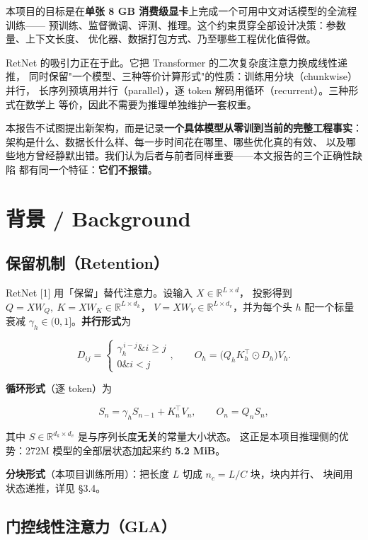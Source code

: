 \documentclass[11pt,openany]{ctexart}
\begin{document}
本项目的目标是在\textbf{单张 8 GB 消费级显卡}上完成一个可用中文对话模型的全流程训练—— 预训练、监督微调、评测、推理。这个约束贯穿全部设计决策：参数量、上下文长度、 优化器、数据打包方式、乃至哪些工程优化值得做。

RetNet 的吸引力正在于此。它把 Transformer 的二次复杂度注意力换成线性递推， 同时保留"一个模型、三种等价计算形式"的性质：训练用分块（chunkwise）并行， 长序列预填用并行（parallel），逐 token 解码用循环（recurrent）。三种形式在数学上 等价，因此不需要为推理单独维护一套权重。

本报告不试图提出新架构，而是记录\textbf{一个具体模型从零训到当前的完整工程事实}： 架构是什么、数据长什么样、每一步时间花在哪里、哪些优化真的有效、 以及哪些地方曾经静默出错。我们认为后者与前者同样重要——本文报告的三个正确性缺陷 都有同一个特征：\textbf{它们不报错}。

\section{背景 / Background}

\subsection{保留机制（Retention）}

RetNet [1] 用「保留」替代注意力。设输入 $X \in \mathbb{R}^{L \times d}$， 投影得到 $Q = XW_Q,\ K = XW_K \in \mathbb{R}^{L \times d_k}$， $V = XW_V \in \mathbb{R}^{L \times d_v}$，并为每个头 $h$ 配一个标量衰减 $\gamma_h \in (0, 1]$。\textbf{并行形式}为

\[
D_{ij} = \begin{cases} \gamma_h^{\,i-j} \& i \ge j \\ 0 \& i < j \end{cases},
\qquad
O_h = \big(Q_h K_h^{\top} \odot D_h\big) V_h .
\]

\textbf{循环形式}（逐 token）为

\[
S_n = \gamma_h S_{n-1} + K_n^{\top} V_n, \qquad O_n = Q_n S_n ,
\]

其中 $S \in \mathbb{R}^{d_k \times d_v}$ 是与序列长度\textbf{无关}的常量大小状态。 这正是本项目推理侧的优势：272M 模型的全部层状态加起来约 \textbf{5.2 MiB}。

\textbf{分块形式}（本项目训练所用）：把长度 $L$ 切成 $n_c = L/C$ 块，块内并行、 块间用状态递推，详见 §3.4。

\subsection{门控线性注意力（GLA）}
\end{document}
